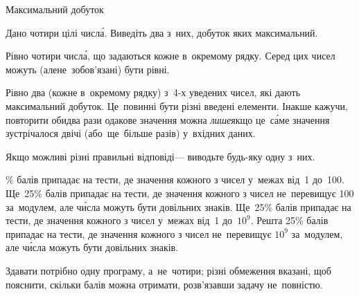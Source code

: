 \begin{problemAllDefault}{Максимальний добуток}

Дано чотири цілі числ\'{а}.
Виведіть два з~них, добуток яких максимальний.

\InputFile
Рівно чотири числ\'{а}, що задаються кожне в~окремому рядку. 
Серед цих чисел можуть (але\nolinebreak[2] не~зобов'язані) бути рівні.

{
\ifAfour{}\fi

\OutputFile
Рівно два (кожне в~окремому рядку) з~\mbox{4-х} уведених чисел, 
які дають максимальний добуток. Це~повинні бути різні введені елементи. 
Інакше кажучи, повторити обидва рази одакове значення 
можна \emph{лише}\nolinebreak[3] якщо це~с\'{а}ме значення 
зустрічалося двічі (або~ще~більше разів) у~вхідних даних.

}

Якщо можливі різні правильні відповіді\nolinebreak[3] --- 
виводьте будь-яку одну з~них.

\Examples
\begin{exampleSimple}{5em}{5em}
%
\end{exampleSimple}
\begin{exampleSimple}{5em}{5em}
%
\end{exampleSimple}


\% балів припадає на тести, де значення кожного з чисел у~межах від~1 до~100.
Ще~25\% балів припадає на тести, де значення кожного з чисел не~перевищує 100 за~модулем, але ч\'{и}сла можуть бути довільних знаків.
Ще~25\% балів припадає на тести, де значення кожного з чисел у~межах від~1 до~$10^9$.
Решта 25\% балів припадає на тести, де значення кожного з чисел не~перевищує $10^9$ за~модулем, але ч\'{и}сла можуть бути довільних знаків.

Здавати потрібно одну програму, а~не~чотири; різні обмеження вказані, щоб пояснити, 
скільки балів можна отримати, розв’язавши задачу не~повністю.

\end{problemAllDefault}

